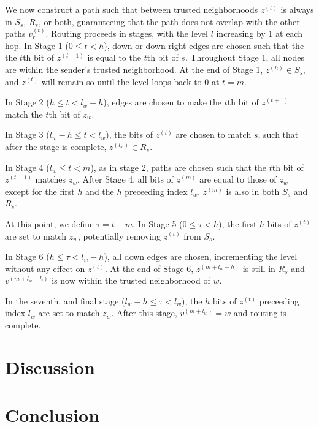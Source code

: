 \documentclass[twocolumn]{article}
\begin{document}
We now construct a path such that between trusted neighborhoods $z^{(t)}$ is always
in $S_s$, $R_s$, or both, guaranteeing that the path does not overlap with the
other paths $v_r^{(t)}$.
Routing proceeds in stages, with the level $l$ increasing by 1 at each hop.
In Stage 1 ($0 \leq t < h$), down or down-right edges
are chosen such that the the $t$th bit of $z^{(t+1)}$ is equal to the $t$th bit
of $s$. Throughout Stage 1, all nodes are within the sender's trusted neighborhood.
At the end of Stage 1, $z^{(h)} \in S_s$, and $z^{(t)}$ will remain so until the level loops
back to $0$ at $t = m$.

In Stage 2 ($h \leq t < l_w - h$), edges are chosen to make the $t$th bit of
$z^{(t+1)}$ match the $t$th bit of $z_w$.

In Stage 3 ($l_w - h \leq t < l_w$), the bits of $z^{(t)}$ are chosen to match $s$,
such that after the stage is complete, $z^{(l_w)} \in R_s$.

In Stage 4 ($l_w \leq t < m$), as in stage 2,
paths are chosen such that the $t$th bit of $z^{(t+1)}$ matches $z_w$.
After Stage 4, all bits of $z^{(m)}$ are equal to those of $z_w$
except for the first $h$ and the $h$ preceeding index $l_w$.
$z^{(m)}$ is also in both $S_s$ and $R_s$.

At this point, we define $\tau = t - m$.
In Stage 5 ($0 \leq \tau < h$), the first $h$ bits of $z^{(t)}$ are set to
match $z_w$, potentially removing $z^{(t)}$ from $S_s$.

In Stage 6 ($h \leq \tau < l_w - h$), all down edges are chosen, incrementing
the level without any effect on $z^{(t)}$.
At the end of Stage 6, $z^{(m + l_w - h)}$ is still in $R_s$ and
$v^{(m + l_w - h)}$ is now within the trusted neighborhood of $w$.

In the seventh, and final stage ($l_w - h \leq \tau < l_w$), the $h$ bits of $z^{(t)}$
preceeding index $l_w$ are set to match $z_w$.
After this stage, $v^{(m + l_w)} = w$ and routing is complete.

\section{Discussion}

\section{Conclusion}



\end{document}
